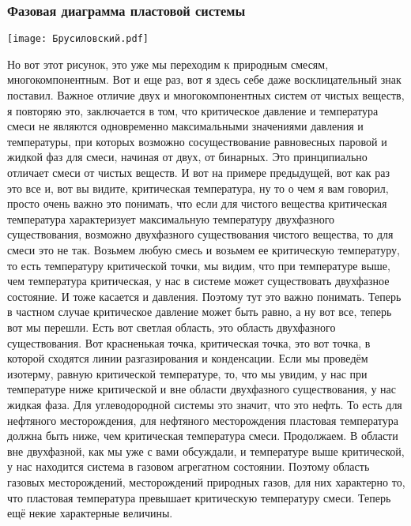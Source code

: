 \documentclass[main.tex]{subfiles}
\begin{document}
\subsubsection{Фазовая диаграмма пластовой системы}

\begin{center}
\texttt{[image: Брусиловский.pdf]}
\end{center}

Но вот этот рисунок, это уже мы переходим к природным смесям, многокомпонентным.
Вот и еще раз, вот я здесь себе даже восклицательный знак поставил.
Важное отличие двух и многокомпонентных систем от чистых веществ, я повторяю это, заключается в том, что критическое давление и температура смеси не являются одновременно максимальными значениями давления и температуры, при которых возможно сосуществование равновесных паровой и жидкой фаз для смеси, начиная от двух, от бинарных.
Это принципиально отличает смеси от чистых веществ.
И вот на примере предыдущей, вот как раз это все и, вот вы видите, критическая температура, ну то о чем я вам говорил, просто очень важно это понимать, что если для чистого вещества критическая температура
характеризует максимальную температуру двухфазного существования, возможно двухфазного существования чистого вещества, то для смеси это не так.
Возьмем любую смесь и возьмем ее критическую температуру, то есть температуру критической точки, мы видим, что при температуре выше, чем температура критическая, у нас в системе может существовать двухфазное состояние.
И тоже касается и давления.
Поэтому тут это важно понимать.
Теперь в частном случае критическое давление может быть равно, а ну вот все, теперь вот мы перешли.
Есть вот светлая область, это область двухфазного существования.
Вот красненькая точка, критическая точка, это вот точка, в которой сходятся линии разгазирования и конденсации.
Если мы проведём изотерму, равную критической температуре, то, что мы увидим, у нас при температуре ниже критической и вне области двухфазного существования, у нас жидкая фаза.
Для углеводородной системы это значит, что это нефть.
То есть для нефтяного месторождения, для нефтяного месторождения пластовая температура должна быть ниже, чем критическая температура смеси.
Продолжаем.
В области вне двухфазной, как мы уже с вами обсуждали, и температуре выше критической, у нас находится система в газовом агрегатном состоянии.
Поэтому область газовых месторождений, месторождений природных газов, для них характерно то, что пластовая температура превышает критическую температуру смеси.
Теперь ещё некие характерные величины.
\end{document}
